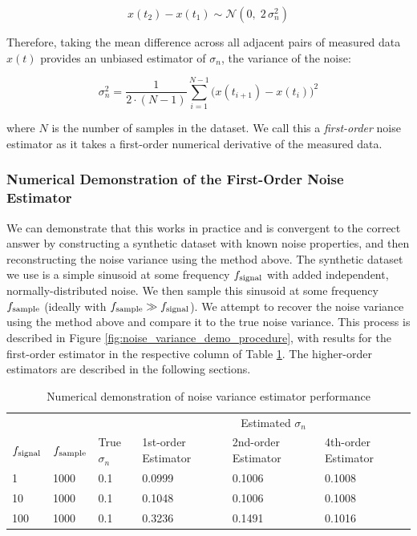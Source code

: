 $$x(t_2) - x(t_1) \sim \mathcal{N}(0,\; 2\, \sigma^2_n)$$

Therefore, taking the mean difference across all adjacent pairs of measured data $x(t)$ provides an unbiased estimator of $\sigma_n$, the variance of the noise:

\begin{equation}
    \sigma^2_n = \frac{1}{2 \cdot (N-1)} \sum_{i=1}^{N-1} \Big( x(t_{i+1}) - x(t_i) \Big)^2
    \label{eq:1st_order_noise_estimator}
\end{equation}

\noindent where $N$ is the number of samples in the dataset. We call this a \emph{first-order} noise estimator as it takes a first-order numerical derivative of the measured data.

\subsubsection{Numerical Demonstration of the First-Order Noise Estimator}

We can demonstrate that this works in practice and is convergent to the correct answer by constructing a synthetic dataset with known noise properties, and then reconstructing the noise variance using the method above. The synthetic dataset we use is a simple sinusoid at some frequency $f_{\rm signal}$ with added independent, normally-distributed noise. We then sample this sinusoid at some frequency $f_{\rm sample}$ (ideally with $f_{\rm sample} \gg f_{\rm signal}$). We attempt to recover the noise variance using the method above and compare it to the true noise variance. This process is described in Figure \ref{fig:noise_variance_demo_procedure}, with results for the first-order estimator in the respective column of Table \ref{tab:noise_variance_demo}. The higher-order estimators are described in the following sections.

\begin{table}[!h]
    \centering
    \caption{Numerical demonstration of noise variance estimator performance}
    \label{tab:noise_variance_demo}
    \begin{tabular}{@{}lll|lll@{}}
        \toprule
        & & & \multicolumn{3}{c}{Estimated $\sigma_n$} \\
        $f_{\rm signal}$ & $f_{\rm sample}$ & True $\sigma_n$ & 1st-order Estimator & 2nd-order Estimator & 4th-order Estimator \\ \midrule
        1                & 1000             & 0.1             & 0.0999              & 0.1006              & 0.1008              \\
        10               & 1000             & 0.1             & 0.1048              & 0.1006              & 0.1008              \\
        100              & 1000             & 0.1             & 0.3236              & 0.1491              & 0.1016              \\ \bottomrule
    \end{tabular}
\end{table}

